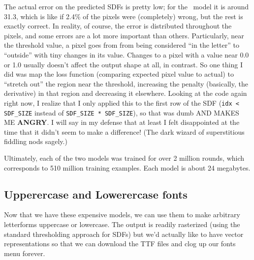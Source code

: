 \documentclass[twocolumn]{article}
\begin{document}
The actual error on the predicted SDFs is pretty low; for the
\makelowercase\ model it is around 31.3, which is like if 2.4\% of the
pixels were (completely) wrong, but the rest is exactly correct. In
reality, of course, the error is distributed throughout the pixels,
and some errors are a lot more important than others. Particularly,
near the threshold value, a pixel goes from from being considered ``in
the letter'' to ``outside'' with tiny changes in its value. Changes to
a pixel with a value near 0.0 or 1.0 usually doesn't affect the output
shape at all, in contrast. So one thing I did was map the loss
function (comparing expected pixel value to actual) to ``stretch out''
the region near the threshold, increasing the penalty (basically, the
derivative) in that region and decreasing it elsewhere. Looking at the
code again right now, I realize that I only applied this to the first
row of the SDF (\verb+idx < SDF_SIZE+ instead of
\verb+SDF_SIZE * SDF_SIZE+), so that was dumb AND MAKES ME {\bf
  ANGRY}. I will say in my defense that at least I felt disappointed
at the time that it didn't seem to make a difference! (The dark
wizard of superstitious fiddling nods sagely.)


Ultimately, each of the two models was trained for over 2 million
rounds, which corresponds to 510 million training examples. Each
model is about 24 megabytes.

\subsection{Upperercase and Lowerercase fonts} \label{sec:fonts}

Now that we have these expensive models, we can use them to make
arbitrary letterforms uppercase or lowercase. The output is readily
rasterized (using the standard thresholding approach for SDFs) but
we'd actually like to have vector representations so that we can
download the TTF files and clog up our fonts menu forever.
\end{document}
